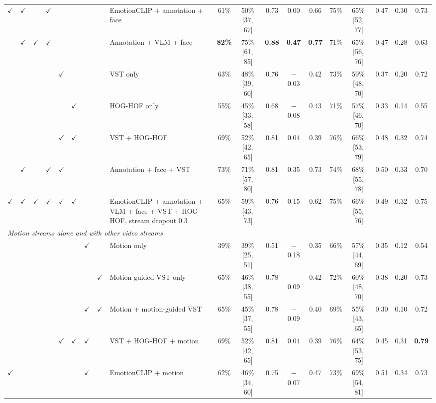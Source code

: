 \documentclass[11pt]{article}
\newcommand{\best}[1]{\textbf{#1}}
\newcommand{\ci}[2]{\,[#1,\,#2]}
\begin{document}
\begin{table}[!htbp]
{\begin{tabular}{cccccccclcccccccccc}
$\checkmark$ & $\checkmark$ &  & $\checkmark$ &  &  &  &  & EmotionCLIP + annotation + face & 61\% & 50\%\ci{37}{67} & 0.73 & 0.00 & 0.66 & 75\% & 65\%\ci{52}{77} & 0.47 & 0.30 & 0.73 \\
 & $\checkmark$ & $\checkmark$ & $\checkmark$ &  &  &  &  & Annotation + VLM + face & \best{82\%} & 75\%\ci{61}{85} & \best{0.88} & \best{0.47} & \best{0.77} & 71\% & 65\%\ci{56}{76} & 0.47 & 0.28 & 0.63 \\
 &  &  &  & $\checkmark$ &  &  &  & VST only & 63\% & 48\%\ci{39}{60} & 0.76 & $-$0.03 & 0.42 & 73\% & 59\%\ci{48}{70} & 0.37 & 0.20 & 0.72 \\
 &  &  &  &  & $\checkmark$ &  &  & HOG-HOF only & 55\% & 45\%\ci{33}{58} & 0.68 & $-$0.08 & 0.43 & 71\% & 57\%\ci{46}{70} & 0.33 & 0.14 & 0.55 \\
 &  &  &  & $\checkmark$ & $\checkmark$ &  &  & VST + HOG-HOF & 69\% & 52\%\ci{42}{65} & 0.81 & 0.04 & 0.39 & 76\% & 66\%\ci{53}{79} & 0.48 & 0.32 & 0.74 \\
 & $\checkmark$ &  & $\checkmark$ & $\checkmark$ &  &  &  & Annotation + face + VST & 73\% & 71\%\ci{57}{80} & 0.81 & 0.35 & 0.73 & 74\% & 68\%\ci{55}{78} & 0.50 & 0.33 & 0.70 \\
$\checkmark$ & $\checkmark$ & $\checkmark$ & $\checkmark$ & $\checkmark$ & $\checkmark$ &  &  & EmotionCLIP + annotation + VLM + face + VST + HOG-HOF, stream dropout 0.3 & 65\% & 59\%\ci{43}{73} & 0.76 & 0.15 & 0.62 & 75\% & 66\%\ci{55}{76} & 0.49 & 0.32 & 0.75 \\
\midrule
\multicolumn{19}{l}{\emph{Motion streams alone and with other video streams}} \\
 &  &  &  &  &  & $\checkmark$ &  & Motion only & 39\% & 39\%\ci{25}{51} & 0.51 & $-$0.18 & 0.35 & 66\% & 57\%\ci{44}{69} & 0.35 & 0.12 & 0.54 \\
 &  &  &  &  &  &  & $\checkmark$ & Motion-guided VST only & 65\% & 46\%\ci{38}{55} & 0.78 & $-$0.09 & 0.42 & 72\% & 60\%\ci{48}{70} & 0.38 & 0.20 & 0.73 \\
 &  &  &  &  &  & $\checkmark$ & $\checkmark$ & Motion + motion-guided VST & 65\% & 45\%\ci{37}{55} & 0.78 & $-$0.09 & 0.40 & 69\% & 55\%\ci{43}{65} & 0.30 & 0.10 & 0.72 \\
 &  &  &  & $\checkmark$ & $\checkmark$ & $\checkmark$ &  & VST + HOG-HOF + motion & 69\% & 52\%\ci{42}{65} & 0.81 & 0.04 & 0.39 & 76\% & 64\%\ci{53}{75} & 0.45 & 0.31 & \best{0.79} \\
$\checkmark$ &  &  &  &  &  & $\checkmark$ &  & EmotionCLIP + motion & 62\% & 46\%\ci{34}{60} & 0.75 & $-$0.07 & 0.47 & 73\% & 69\%\ci{54}{81} & 0.51 & 0.34 & 0.73 \\

\end{tabular}}
\end{table}
\end{document}
